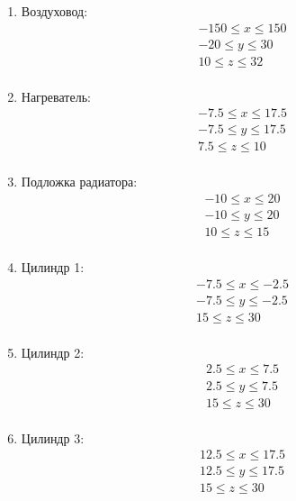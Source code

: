 \documentclass[a4paper,12pt]{article}
\theoremstyle{plain} %
\theoremstyle{definition} %
\theoremstyle{remark} %
\begin{document}
\begin{enumerate}
	\item Воздуховод:
	      \[
		      \begin{aligned}
			       & -150 \leq x \leq 150 \\
			       & -20 \leq y \leq 30   \\
			       & 10 \leq z \leq 32    \\
		      \end{aligned}
	      \]
	      
	\item Нагреватель:
	      \[
		      \begin{aligned}
			       & -7.5 \leq x \leq 17.5 \\
			       & -7.5 \leq y \leq 17.5 \\
			       & 7.5 \leq z \leq 10    \\
		      \end{aligned}
	      \]
	      
	\item Подложка радиатора:
	      \[
		      \begin{aligned}
			       & -10 \leq x \leq 20 \\
			       & -10 \leq y \leq 20 \\
			       & 10 \leq z \leq 15  \\
		      \end{aligned}
	      \]
	      
	\item Цилиндр 1:
	      \[
		      \begin{aligned}
			       & -7.5 \leq x \leq -2.5 \\
			       & -7.5 \leq y \leq -2.5 \\
			       & 15 \leq z \leq 30     \\
		      \end{aligned}
	      \]
	      
	\item Цилиндр 2:
	      \[
		      \begin{aligned}
			       & 2.5 \leq x \leq 7.5 \\
			       & 2.5 \leq y \leq 7.5 \\
			       & 15 \leq z \leq 30   \\
		      \end{aligned}
	      \]
	      
	\item Цилиндр 3:
	      \[
		      \begin{aligned}
			       & 12.5 \leq x \leq 17.5 \\
			       & 12.5 \leq y \leq 17.5 \\
			       & 15 \leq z \leq 30     \\
		      \end{aligned}
	      \]
\end{enumerate}
\end{document}
